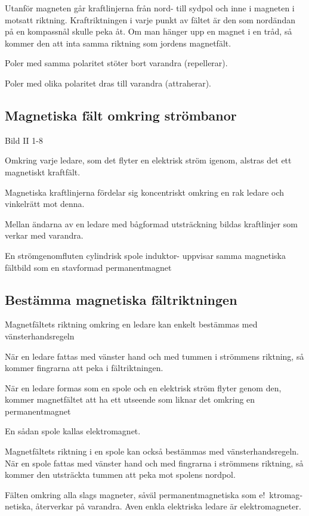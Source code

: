 \documentclass[a4paper,twoside,twocolumn,openright]{book}
\begin{document}
Utanför magneten går kraftlinjerna från nord- till sydpol och inne i magneten i motsatt
riktning. Kraftriktningen i varje punkt av fältet är den som nordändan på en kompassnål
skulle peka åt. Om man hänger upp en magnet i en tråd, så kommer den att inta
samma riktning som jordens magnetfält.

Poler med samma polaritet stöter bort varandra (repellerar).

Poler med olika polaritet dras till varandra (attraherar).

\subsection{Magnetiska fält omkring strömbanor}

Bild II 1-8

Omkring varje ledare, som det flyter en elektrisk ström igenom, alstras det ett
magnetiskt kraftfält.

Magnetiska kraftlinjerna fördelar sig koncentriskt omkring en rak ledare och vinkelrätt
mot denna.

Mellan ändarna av en ledare med bågformad utsträckning bildas kraftlinjer som verkar med
varandra.

En strömgenomfluten cylindrisk spole induktor- uppvisar samma magnetiska fältbild som en stavformad permanentmagnet

\subsection{Bestämma magnetiska fältriktningen}

Magnetfältets riktning omkring en ledare kan enkelt bestämmas med vänsterhandsregeln

När en ledare fattas med vänster hand och med tummen i strömmens riktning, så
kommer fingrarna att peka i fältriktningen.

När en ledare formas som en spole och en elektrisk ström flyter genom den, kommer
magnetfältet att ha ett utseende som liknar det omkring en permanentmagnet

En sådan spole kallas elektromagnet.

Magnetfältets riktning i en spole kan också bestämmas med vänsterhandsregeln.
När en spole fattas med vänster hand och med fingrarna i strömmens riktning, så
kommer den utsträckta tummen att peka mot spolens nordpol.

Fälten omkring alla slags magneter, såväl permanentmagnetiska som e!~ktromag­
netiska, återverkar på varandra. Aven enkla
elektriska ledare är elektromagneter.
\end{document}
